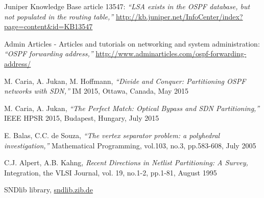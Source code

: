 \documentclass[journal]{IEEEtran}
\begin{document}
\begin{thebibliography}{1}
 Juniper Knowledge Base article 13547: \emph{``LSA exists in the OSPF database, but not populated in the routing table,''} \url{http://kb.juniper.net/InfoCenter/index?page=content&id=KB13547}

 Admin Articles - Articles and tutorials on networking and system administration: \emph{``OSPF forwarding address,''} \url{http://www.adminarticles.com/ospf-forwarding-address/}

 M. Caria, A. Jukan, M. Hoffmann, \emph{``Divide and Conquer: Partitioning OSPF networks with SDN,''} IM 2015, Ottawa, Canada, May 2015

 M. Caria, A. Jukan, \emph{``The Perfect Match: Optical Bypass and SDN Partitioning,''} IEEE HPSR 2015, Budapest, Hungary, July 2015

 E. Balas, C.C. de Souza, \emph{``The vertex separator problem: a polyhedral investigation,''} Mathematical Programming, vol.103, no.3, pp.583-608, July 2005

 C.J. Alpert, A.B. Kahng, \emph{Recent Directions in Netlist Partitioning: A Survey,} Integration, the VLSI Journal,  vol. 19, no.1-2, pp.1-81, August 1995

 SNDlib library, \url{sndlib.zib.de}

\end{thebibliography}
\end{document}
